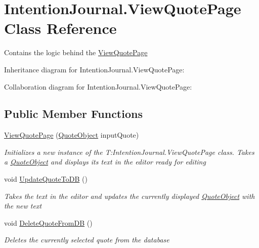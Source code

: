 \hypertarget{class_intention_journal_1_1_view_quote_page}{}\section{Intention\+Journal.\+View\+Quote\+Page Class Reference}
\label{class_intention_journal_1_1_view_quote_page}


Contains the logic behind the \hyperlink{class_intention_journal_1_1_view_quote_page}{View\+Quote\+Page}  




Inheritance diagram for Intention\+Journal.\+View\+Quote\+Page\+:


Collaboration diagram for Intention\+Journal.\+View\+Quote\+Page\+:
\subsection*{Public Member Functions}
\begin{DoxyCompactItemize}
\item 
\hyperlink{class_intention_journal_1_1_view_quote_page_a3c37e804a7934e234c0e7002c52d5fe0}{View\+Quote\+Page} (\hyperlink{class_intention_journal_1_1_quote_object}{Quote\+Object} input\+Quote)
\begin{DoxyCompactList}\small\item\em Initializes a new instance of the T\+:\+Intention\+Journal.\+View\+Quote\+Page class. Takes a \hyperlink{class_intention_journal_1_1_quote_object}{Quote\+Object} and displays its text in the editor ready for editing \end{DoxyCompactList}\item 
void \hyperlink{class_intention_journal_1_1_view_quote_page_af08dc7548b3a5b84ba4e5e0e608a441e}{Update\+Quote\+To\+DB} ()
\begin{DoxyCompactList}\small\item\em Takes the text in the editor and updates the currently displayed \hyperlink{class_intention_journal_1_1_quote_object}{Quote\+Object} with the new text \end{DoxyCompactList}\item 
void \hyperlink{class_intention_journal_1_1_view_quote_page_ac1f63f1b2d83332d872d3187dd0249c1}{Delete\+Quote\+From\+DB} ()
\begin{DoxyCompactList}\small\item\em Deletes the currently selected quote from the database \end{DoxyCompactList}\end{DoxyCompactItemize}


